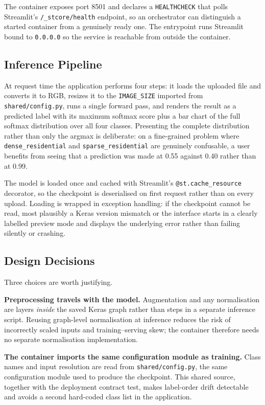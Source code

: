\documentclass[11pt,twoside,a4paper]{article}
\begin{document}
The container exposes port 8501 and declares a \texttt{HEALTHCHECK} that polls
Streamlit's \texttt{/\_stcore/health} endpoint, so an orchestrator can
distinguish a started container from a genuinely ready one. The entrypoint runs
Streamlit bound to \texttt{0.0.0.0} so the service is reachable from outside the
container.

\subsection{Inference Pipeline}

At request time the application performs four steps: it loads the uploaded file
and converts it to RGB, resizes it to the \texttt{IMAGE\_SIZE} imported from
\texttt{shared/config.py}, runs a single forward pass, and renders the result as
a predicted label with its maximum softmax score plus a bar chart of the full
softmax distribution over all four classes. Presenting the complete distribution
rather than only the argmax is deliberate: on a fine-grained problem where
\texttt{dense\_residential} and \texttt{sparse\_residential} are genuinely
confusable, a user benefits from seeing that a prediction was made at 0.55
against 0.40 rather than at 0.99.

The model is loaded once and cached with Streamlit's
\texttt{@st.cache\_resource} decorator, so the checkpoint is deserialised on
first request rather than on every upload. Loading is wrapped in exception
handling: if the checkpoint cannot be read, most plausibly a Keras version
mismatch or the interface starts in a clearly labelled preview mode and
displays the underlying error rather than failing silently or crashing.

\subsection{Design Decisions}

Three choices are worth justifying.

\textbf{Preprocessing travels with the model.} Augmentation and any
normalisation are layers \emph{inside} the saved Keras graph rather than steps
in a separate inference script. Reusing graph-level normalisation at inference
reduces the risk of incorrectly scaled inputs and training--serving skew; the
container therefore needs no separate normalisation implementation.

\textbf{The container imports the same configuration module as training.}
Class names and input resolution are read from \texttt{shared/config.py}, the
same configuration module used to produce the checkpoint. This shared source,
together with the deployment contract test, makes label-order drift detectable
and avoids a second hard-coded class list in the application.
\end{document}
